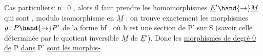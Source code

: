 Cas particuliers:  n=0 , alors  il faut prendre  les  homomorphismes
$\underline{E}' \hand{\to} \underline{M}$  qui sont , modulo isomorphisme en $\underline{M}$ : on trouve
exactement les  morphismes  $g\colon P \hand{\to} P'$  de la forme  hf , où  h est une
section de  P' sur S  (savoir celle déterminée par  le quotient inversible
$\underline{M}$ de $\underline{E}'$). Donc les \uline{morphismes de  degré 0}  \uline{de} P \uline{dans} P' \uline{sont les morphis-}\margin{\ensuremath{\backslash}}%


